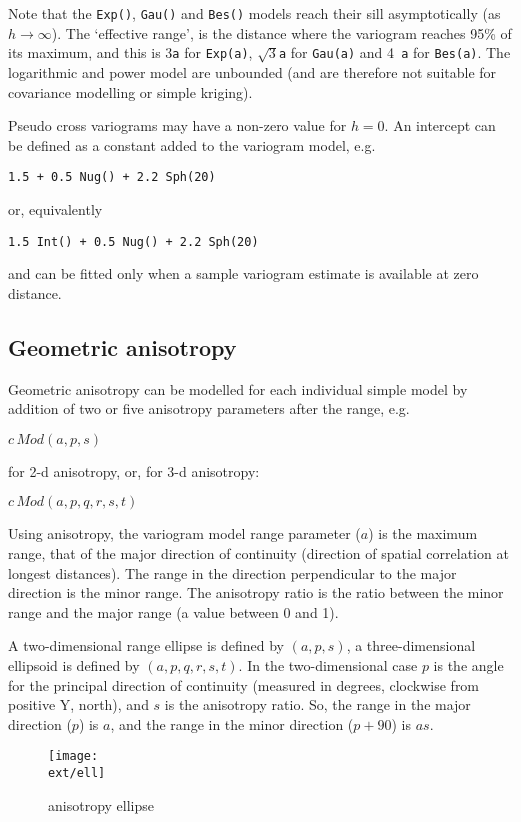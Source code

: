\documentclass[a4paper,12pt]{book}
\newcommand{\ext}{pdf}
\begin{document}
Note that the {\tt Exp()}, {\tt Gau()} and {\tt Bes()} models reach their
sill asymptotically (as $h \rightarrow \infty$). The `effective range',
is the distance where the variogram reaches 95\% of its maximum, and this
is 3{\tt a} for {\tt Exp(a)}, $\sqrt{3}${\tt a} for {\tt Gau(a)} and 4{\tt
a} for {\tt Bes(a)}. The logarithmic and power model are unbounded (and
are therefore not suitable for covariance modelling or simple kriging).

Pseudo cross variograms may have a non-zero value for $h=0$. An intercept
can be defined as a constant added to the variogram model, e.g.

{\tt 1.5 + 0.5 Nug() + 2.2 Sph(20)}

\noindent
or, equivalently

{\tt 1.5 Int() + 0.5 Nug() + 2.2 Sph(20) }

\noindent
and can be fitted only when a sample variogram estimate is available at
zero distance.

\subsection*{Geometric anisotropy}

Geometric anisotropy can be modelled for each individual simple model
by addition of two or five anisotropy parameters after the range, e.g.

$c \, Mod(a,p,s)$

\noindent
for 2-d anisotropy, or, for 3-d anisotropy:

$c \, Mod(a,p,q,r,s,t)$

\noindent
Using anisotropy, the variogram model range parameter ($a$) is the
maximum range, that of the major direction of continuity (direction of
spatial correlation at longest distances). The range in the direction
perpendicular to the major direction is the minor range. The anisotropy
ratio is the ratio between the minor range and the major range (a value
between 0 and 1).

A two-dimensional range ellipse is defined by $(a,p,s)$, a
three-dimensional ellipsoid is defined by $(a,p,q,r,s,t)$. In the
two-dimensional case $p$ is the angle for the principal direction of
continuity (measured in degrees, clockwise from positive Y, north),
and $s$ is the anisotropy ratio. So, the range in the major direction
($p$) is $a$, and the range in the minor direction ($p+90$) is $as$.

\begin{figure}[ht]
\begin{center}
\texttt{[image: \\ext/ell]}
\end{center}
\label{fig:ell}
\caption{anisotropy ellipse}
\end{figure}
\end{document}
